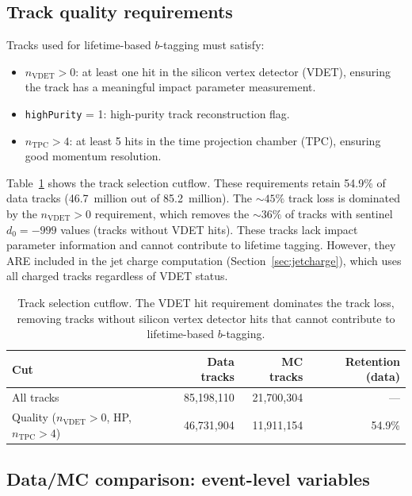 \documentclass[11pt,a4paper]{article}
\begin{document}
\subsection{Track quality requirements}
\label{sec:track_quality}

Tracks used for lifetime-based $b$-tagging must satisfy:
\begin{itemize}
\item $n_\mathrm{VDET} > 0$: at least one hit in the silicon vertex detector (VDET),
ensuring the track has a meaningful impact parameter measurement.
\item \texttt{highPurity} = 1: high-purity track reconstruction flag.
\item $n_\mathrm{TPC} > 4$: at least 5 hits in the time projection chamber (TPC),
ensuring good momentum resolution.
\end{itemize}

Table~\ref{tab:track_cutflow} shows the track selection cutflow.
These requirements retain 54.9\% of data tracks (46.7~million out of 85.2~million).
The $\sim 45\%$ track loss is dominated by the $n_\mathrm{VDET} > 0$ requirement,
which removes the $\sim 36\%$ of tracks with sentinel $d_0 = -999$ values (tracks
without VDET hits). These tracks lack impact parameter information and cannot
contribute to lifetime tagging. However, they ARE included in the jet charge
computation (Section~\ref{sec:jetcharge}), which uses all charged tracks regardless
of VDET status.

\begin{table}[htbp]
\centering
\caption{Track selection cutflow. The VDET hit requirement dominates the track loss,
removing tracks without silicon vertex detector hits that cannot contribute to
lifetime-based $b$-tagging.}
\label{tab:track_cutflow}
\begin{tabular}{lrrr}
\toprule
Cut & Data tracks & MC tracks & Retention (data) \\
\midrule
All tracks & 85,198,110 & 21,700,304 & --- \\
Quality ($n_\mathrm{VDET} > 0$, HP, $n_\mathrm{TPC} > 4$) & 46,731,904 & 11,911,154 & 54.9\% \\
\bottomrule
\end{tabular}
\end{table}

\subsection{Data/MC comparison: event-level variables}
\label{sec:datamc_event}
\end{document}
